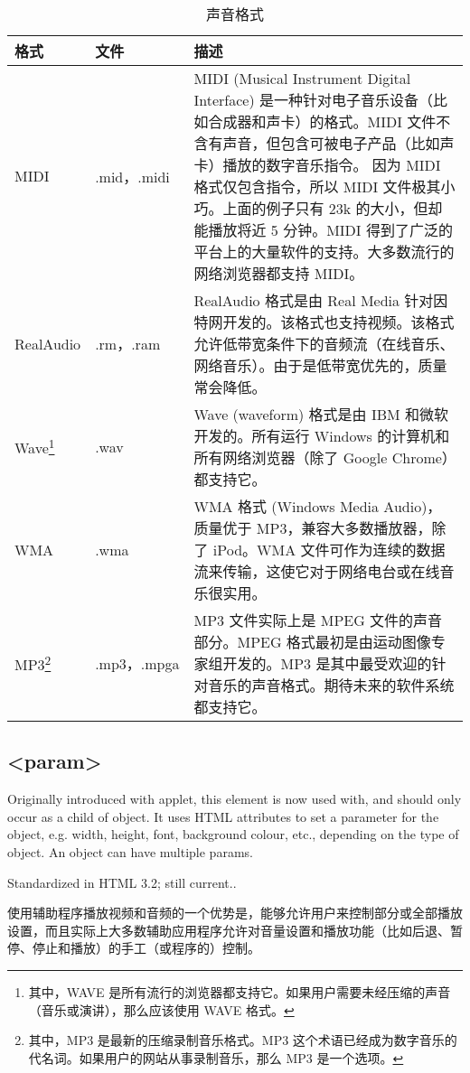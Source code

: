 \begin{table}
\centering
\caption{声音格式}
\begin{tabular}{|p{50pt}|p{50pt}|p{200pt}|}
\hline
格式		&文件		&描述		\\
\hline
MIDI		&.mid，.midi	&MIDI (Musical Instrument Digital Interface) 是一种针对电子音乐设备（比如合成器和声卡）的格式。MIDI 文件不含有声音，但包含可被电子产品（比如声卡）播放的数字音乐指令。\newline
因为 MIDI 格式仅包含指令，所以 MIDI 文件极其小巧。上面的例子只有 23k 的大小，但却能播放将近 5 分钟。MIDI 得到了广泛的平台上的大量软件的支持。大多数流行的网络浏览器都支持 MIDI。\\
RealAudio&.rm，.ram	&RealAudio 格式是由 Real Media 针对因特网开发的。该格式也支持视频。该格式允许低带宽条件下的音频流（在线音乐、网络音乐）。由于是低带宽优先的，质量常会降低。\\
\hline
Wave\footnote{其中，WAVE 是所有流行的浏览器都支持它。如果用户需要未经压缩的声音（音乐或演讲），那么应该使用 WAVE 格式。}	&.wav		&Wave (waveform) 格式是由 IBM 和微软开发的。所有运行 Windows 的计算机和所有网络浏览器（除了 Google Chrome）都支持它。\\
\hline
WMA	&.wma		&WMA 格式 (Windows Media Audio)，质量优于 MP3，兼容大多数播放器，除了 iPod。WMA 文件可作为连续的数据流来传输，这使它对于网络电台或在线音乐很实用。\\
\hline
MP3\footnote{其中，MP3 是最新的压缩录制音乐格式。MP3 这个术语已经成为数字音乐的代名词。如果用户的网站从事录制音乐，那么 MP3 是一个选项。}		&.mp3，.mpga &MP3 文件实际上是 MPEG 文件的声音部分。MPEG 格式最初是由运动图像专家组开发的。MP3 是其中最受欢迎的针对音乐的声音格式。期待未来的软件系统都支持它。\\
\hline
\end{tabular}
\end{table}

\subsection{<param>}

Originally introduced with applet, this element is now used with, and should only occur as a child of object. It uses HTML attributes to set a parameter for the object, e.g. width, height, font, background colour, etc., depending on the type of object. An object can have multiple params.


Standardized in HTML 3.2; still current..

使用辅助程序播放视频和音频的一个优势是，能够允许用户来控制部分或全部播放设置，而且实际上大多数辅助应用程序允许对音量设置和播放功能（比如后退、暂停、停止和播放）的手工（或程序的）控制。


